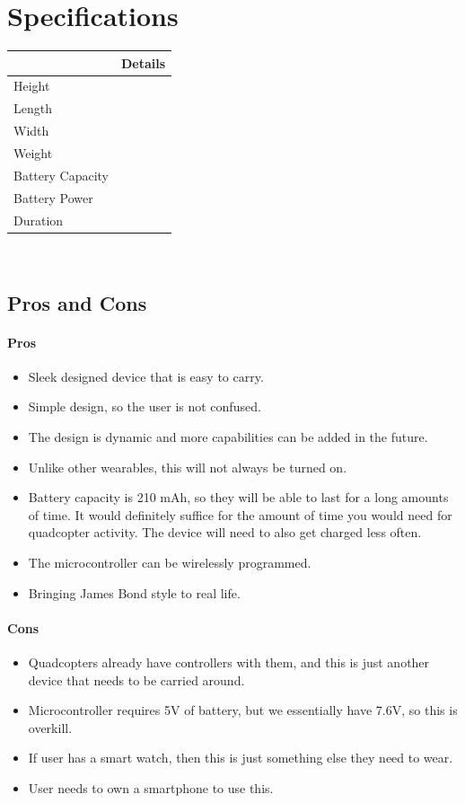 \documentclass[12pt,letterpaper]{article}
\begin{document}
\section*{Specifications}
\begin{tabular}{| l | l |}
	 \hline
	 & Details \\ \hline
	Height &  \\ %
	Length &  \\ %
	Width &  \\ %
	Weight &  \\ %
	Battery Capacity &  \\ %
	Battery Power &  \\ %
	Duration &  \\ \hline
\end{tabular} \\

\subsection*{Pros and Cons}
\paragraph{Pros}
\begin{itemize}
	\item Sleek designed device that is easy to carry.
	\item Simple design, so the user is not confused.
	\item The design is dynamic and more capabilities can be added in the future.
	\item Unlike other wearables, this will not always be turned on.
	\item Battery capacity is 210 mAh, so they will be able to last for a long amounts of time. It would definitely suffice for the amount of time you would need for quadcopter activity. The device will need to also get charged less often.
	\item The microcontroller can be wirelessly programmed.
	\item Bringing James Bond style to real life.
\end{itemize}

\paragraph{Cons}
\begin{itemize}
	\item Quadcopters already have controllers with them, and this is just another device that needs to be carried around.
	\item Microcontroller requires 5V of battery, but we essentially have 7.6V, so this is overkill.
	\item If user has a smart watch, then this is just something else they need to wear.
	\item User needs to own a smartphone to use this.
\end{itemize}
\end{document}
